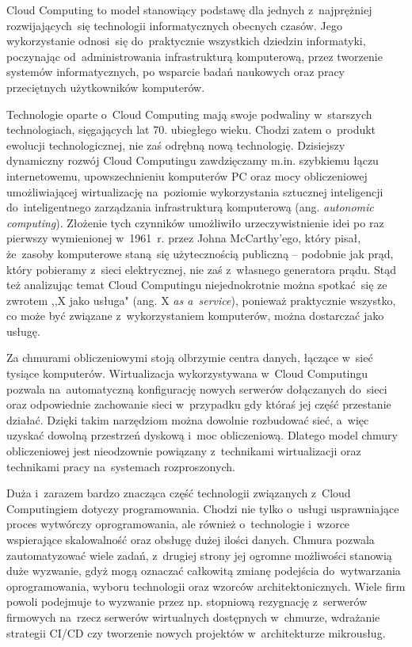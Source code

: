 \documentclass[12pt,a4paper,twoside,titlepage,openright]{book}
\begin{document}
Cloud Computing to model stanowiący podstawę dla jednych z~najprężniej rozwijających~się technologii informatycznych obecnych czasów. Jego wykorzystanie odnosi~się do~praktycznie wszystkich dziedzin informatyki, poczynając od~administrowania infrastrukturą komputerową, przez tworzenie systemów informatycznych, po wsparcie badań naukowych oraz pracy przeciętnych użytkowników komputerów. 

Technologie oparte o~Cloud Computing mają swoje podwaliny w~starszych technologiach, sięgających lat 70. ubiegłego wieku. Chodzi zatem o~produkt ewolucji technologicznej, nie zaś odrębną nową technologię. Dzisiejszy dynamiczny rozwój Cloud Computingu zawdzięczamy m.in. szybkiemu łączu internetowemu, upowszechnieniu komputerów PC oraz mocy obliczeniowej umożliwiającej wirtualizację na~poziomie wykorzystania sztucznej inteligencji do~inteligentnego zarządzania infrastrukturą komputerową (ang. \textit{autonomic computing}). Złożenie tych czynników umożliwiło urzeczywistnienie idei po raz pierwszy wymienionej w~1961~r. przez Johna McCarthy'ego, który pisał, że~zasoby komputerowe staną~się użytecznością publiczną -- podobnie jak prąd, który pobieramy z~sieci elektrycznej, nie zaś z~własnego generatora prądu.\cite{ccCambridge,ccSpringer} Stąd też analizując temat Cloud Computingu niejednokrotnie można spotkać~się ze zwrotem ,,X jako usługa" (ang. X \textit{as a~service}), ponieważ praktycznie wszystko, co może być związane z~wykorzystaniem komputerów, można dostarczać jako usługę. \cite{ccCambridge}

Za chmurami obliczeniowymi stoją olbrzymie centra danych, łączące w~sieć tysiące komputerów. Wirtualizacja wykorzystywana w~Cloud Computingu pozwala na~automatyczną konfigurację nowych serwerów dołączanych do~sieci oraz odpowiednie zachowanie sieci w~przypadku gdy któraś jej część przestanie działać. Dzięki takim narzędziom można dowolnie rozbudować sieć, a~więc uzyskać dowolną przestrzeń dyskową i~moc obliczeniową. Dlatego model chmury obliczeniowej jest nieodzownie powiązany z~technikami wirtualizacji oraz technikami pracy na~systemach rozproszonych.

Duża i~zarazem bardzo znacząca część technologii związanych z~Cloud Computingiem dotyczy programowania. Chodzi nie tylko o~usługi usprawniające proces wytwórczy oprogramowania, ale również o~technologie i~wzorce wspierające skalowalność oraz obsługę dużej ilości danych. Chmura pozwala zautomatyzować wiele zadań, z~drugiej strony jej ogromne możliwości stanowią duże wyzwanie, gdyż mogą oznaczać całkowitą zmianę podejścia do~wytwarzania oprogramowania, wyboru technologii oraz wzorców architektonicznych. Wiele firm powoli podejmuje to wyzwanie przez np. stopniową rezygnację z~serwerów firmowych na~rzecz serwerów wirtualnych dostępnych w~chmurze, wdrażanie strategii CI/CD czy tworzenie nowych projektów w~architekturze mikrousług. 
\end{document}
